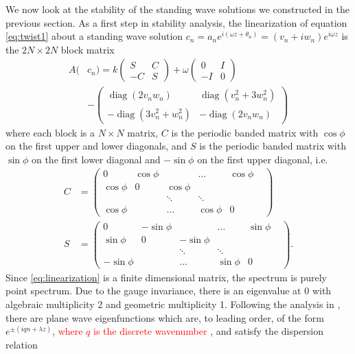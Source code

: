 \documentclass[reprint, amsmath,amssymb,aps,pra]{revtex4-2}
\DeclareMathOperator{\diag}{diag}
\renewcommand{\revised}[1]{ \textcolor{red}{#1} }
\begin{document}
We now look at the stability of the standing wave solutions we constructed in the previous section. As a first step in stability analysis, the linearization of equation \cref{eq:twist1} about a standing wave solution $c_n = a_n e^{i (\omega z + \theta_n) } = (v_n + i w_n)e^{i\omega z}$ is the $2N \times 2N$ block matrix
\begin{equation}\label{eq:linearization}
\begin{aligned}
A(&c_n) =
k \begin{pmatrix}S & C \\ -C & S \end{pmatrix}
+ \omega\begin{pmatrix}0 & I \\ -I & 0 \end{pmatrix} \\
&-\begin{pmatrix} \diag(2v_n w_n) & \diag(v_n^2 + 3 w_n^2) \\
-\diag(3 v_n^2 + w_n^2) & -\diag(2v_n w_n) \end{pmatrix}
\end{aligned}
\end{equation}
where each block is a $N\times N$ matrix, $C$ is the periodic banded matrix with $\cos \phi$ on the first upper and lower diagonals, and $S$ is the periodic banded matrix with $\sin \phi$ on the first lower diagonal and $-\sin \phi$ on the first upper diagonal, i.e.
\begin{align*}
C &= \begin{pmatrix}
0 & \cos \phi & & \dots & \cos \phi \\
\cos \phi & 0 & \cos \phi & & & \\
& & \ddots & \ddots &  & \\
\cos \phi & & \dots & \cos \phi & 0
\end{pmatrix} \\ 
S &= \begin{pmatrix}
0 & -\sin \phi & & \dots & \sin \phi \\
\sin \phi & 0 & -\sin \phi & & & \\
& & \ddots & \ddots &  & \\
-\sin \phi & & \dots & \sin \phi & 0
\end{pmatrix}.
\end{align*}
Since \cref{eq:linearization} is a finite dimensional matrix, the spectrum is purely point spectrum. Due to the gauge invariance, there is an eigenvalue at 0 with algebraic multiplicity 2 and geometric multiplicity 1. Following the analysis in \cite[Section 2.1.1.1]{Kevrekidis2009}, there are plane wave eigenfunctions which are, to leading order, of the form $e^{\pm( i q n + \lambda z)}$, \revised{where $q$ is the discrete wavenumber}, and satisfy the dispersion relation
\end{document}
